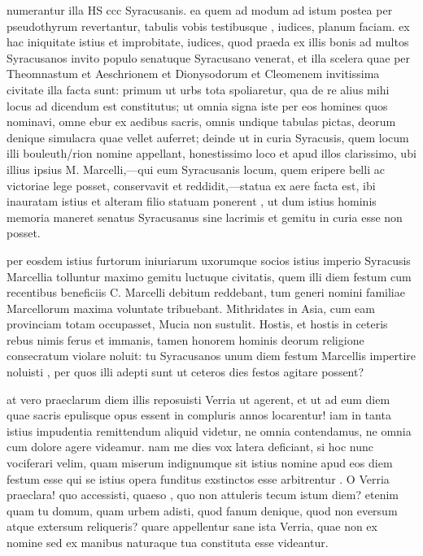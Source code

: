  numerantur illa HS ccc Syracusanis. ea quem ad modum ad istum postea per pseudothyrum revertantur, tabulis vobis testibusque , iudices, planum faciam. ex hac iniquitate istius et improbitate, iudices, quod praeda ex illis bonis ad multos Syracusanos invito populo senatuque Syracusano venerat, et illa scelera quae per Theomnastum et Aeschrionem et Dionysodorum et Cleomenem invitissima civitate illa facta sunt: primum ut urbs tota spoliaretur, qua de re alius mihi locus ad dicendum est constitutus; ut omnia signa iste per eos homines quos nominavi, omne ebur ex aedibus sacris, omnis undique tabulas pictas, deorum denique simulacra quae vellet auferret; deinde ut in curia Syracusis, quem locum illi bouleuth/rion nomine appellant, honestissimo loco et apud illos clarissimo, ubi illius ipsius M. Marcelli,—qui eum Syracusanis locum, quem eripere belli ac victoriae lege posset, conservavit et reddidit,—statua ex aere facta est, ibi inauratam istius et alteram filio statuam ponerent , ut dum istius hominis memoria maneret senatus Syracusanus sine lacrimis et gemitu in curia esse non posset.

 per eosdem istius furtorum iniuriarum uxorumque socios istius imperio Syracusis Marcellia tolluntur maximo gemitu luctuque civitatis, quem illi diem festum cum recentibus beneficiis C. Marcelli debitum reddebant, tum generi nomini familiae Marcellorum maxima voluntate tribuebant. Mithridates in Asia, cum eam provinciam totam occupasset, Mucia non sustulit. Hostis, et hostis in ceteris rebus nimis ferus et immanis, tamen honorem hominis deorum religione consecratum violare noluit: tu Syracusanos unum diem festum Marcellis impertire noluisti , per quos illi adepti sunt ut ceteros dies festos agitare possent?

 at vero praeclarum diem illis reposuisti Verria ut agerent, et ut ad eum diem quae sacris epulisque opus essent in compluris annos locarentur! iam in tanta istius impudentia remittendum aliquid videtur, ne omnia contendamus, ne omnia cum dolore agere videamur. nam me dies vox latera deficiant, si hoc nunc vociferari velim, quam miserum indignumque sit istius nomine apud eos diem festum esse qui se istius opera funditus exstinctos esse arbitrentur . O Verria praeclara! quo accessisti, quaeso , quo non attuleris tecum istum diem? etenim quam tu domum, quam urbem adisti, quod fanum denique, quod non eversum atque extersum reliqueris? quare appellentur sane ista Verria, quae non ex nomine sed ex manibus naturaque tua constituta esse videantur.

